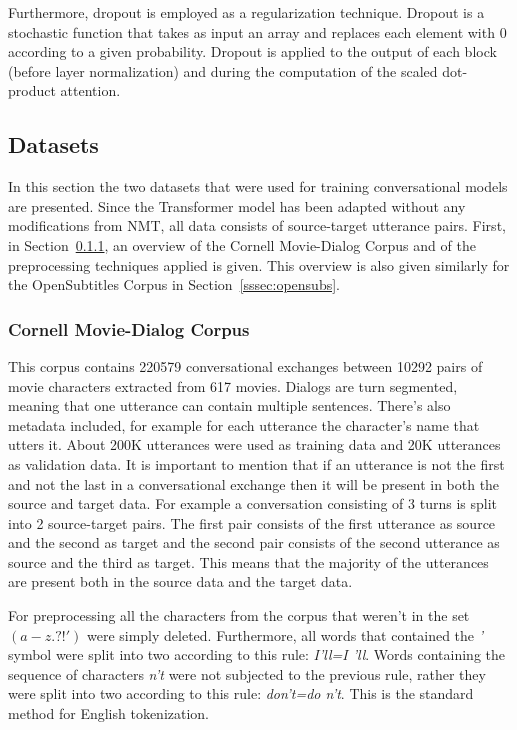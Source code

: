 \documentclass[12pt]{article}
\begin{document}
Furthermore, dropout \cite{Dropout:2014} is employed as a regularization technique. Dropout is a stochastic function that takes as input an array and replaces each element with 0 according to a given probability. Dropout is applied to the output of each block (before layer normalization) and during the computation of the scaled dot-product attention. 

\subsection{Datasets} \label{ssec:42}
In this section the two datasets that were used for training conversational models are presented. Since the Transformer model has been adapted without any modifications from NMT, all data consists of source-target utterance pairs. First, in Section~\ref{sssec:cornell}, an overview of the Cornell Movie-Dialog Corpus \cite{Danescu:2011} and of the preprocessing techniques applied is given. This overview is also given similarly for the OpenSubtitles Corpus \cite{Tiedemann:2009} in Section~\ref{sssec:opensubs}.

\subsubsection{Cornell Movie-Dialog Corpus} \label{sssec:cornell}
This corpus contains 220579 conversational exchanges between 10292 pairs of movie characters extracted from 617 movies. Dialogs are turn segmented, meaning that one utterance can contain multiple sentences. There's also metadata included, for example for each utterance the character's name that utters it. About 200K utterances were used as training data and 20K utterances as validation data. It is important to mention that if an utterance is not the first and not the last in a conversational exchange then it will be present in both the source and target data. For example a conversation consisting of 3 turns is split into 2 source-target pairs. The first pair consists of the first utterance as source and the second as target and the second pair consists of the second utterance as source and the third as target. This means that the majority of the utterances are present both in the source data and the target data.

For preprocessing all the characters from the corpus that weren't in the set \((a-z . ? ! ')\) were simply deleted. Furthermore, all words that contained the \textit{'} symbol were split into two according to this rule: \textit{I'll=I 'll}. Words containing the sequence of characters \textit{n't} were not subjected to the previous rule, rather they were split into two according to this rule: \textit{don't=do n't}. This is the standard method for English tokenization.
\end{document}
